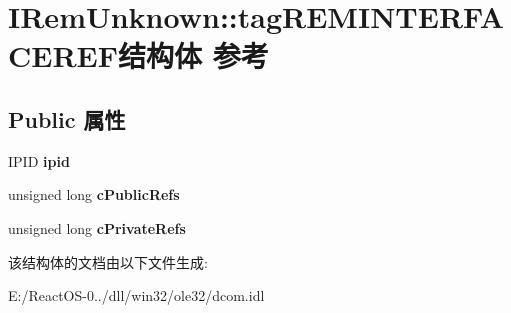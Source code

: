 \hypertarget{struct_i_rem_unknown_1_1tag_r_e_m_i_n_t_e_r_f_a_c_e_r_e_f}{}\section{I\+Rem\+Unknown\+:\+:tag\+R\+E\+M\+I\+N\+T\+E\+R\+F\+A\+C\+E\+R\+E\+F结构体 参考}
\label{struct_i_rem_unknown_1_1tag_r_e_m_i_n_t_e_r_f_a_c_e_r_e_f}
\subsection*{Public 属性}
\begin{DoxyCompactItemize}
\item 
\mbox{\label{struct_i_rem_unknown_1_1tag_r_e_m_i_n_t_e_r_f_a_c_e_r_e_f_a8ba4e9e3f2c952b674fa2f1094e18b68}} 
I\+P\+ID {\bfseries ipid}
\item 
\mbox{\label{struct_i_rem_unknown_1_1tag_r_e_m_i_n_t_e_r_f_a_c_e_r_e_f_a8606dbea35e626833df908baf237e309}} 
unsigned long {\bfseries c\+Public\+Refs}
\item 
\mbox{\label{struct_i_rem_unknown_1_1tag_r_e_m_i_n_t_e_r_f_a_c_e_r_e_f_ad56d9e5ad1f39aad6702d1af7c13090e}} 
unsigned long {\bfseries c\+Private\+Refs}
\end{DoxyCompactItemize}


该结构体的文档由以下文件生成\+:\begin{DoxyCompactItemize}
\item 
E\+:/\+React\+O\+S-\/0../dll/win32/ole32/dcom.\+idl\end{DoxyCompactItemize}
